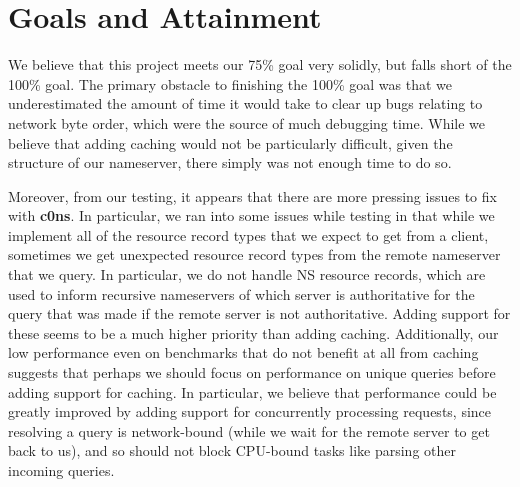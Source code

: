 \documentclass{article}
\newcommand\Kwd[1]{{\sffamily\bfseries{#1}}}
\begin{document}
\section{Goals and Attainment}

We believe that this project meets our 75\% goal very solidly, but falls short of the 100\% goal. The primary obstacle to finishing the 100\% goal was that we underestimated the amount of time it would take to clear up bugs relating to network byte order, which were the source of much debugging time. While we believe that adding caching would not be particularly difficult, given the structure of our nameserver, there simply was not enough time to do so.

Moreover, from our testing, it appears that there are more pressing issues to fix with \Kwd{c0ns}. In particular, we ran into some issues while testing in that while we implement all of the resource record types that we expect to get from a client, sometimes we get unexpected resource record types from the remote nameserver that we query. In particular, we do not handle NS resource records, which are used to inform recursive nameservers of which server is authoritative for the query that was made if the remote server is not authoritative. Adding support for these seems to be a much higher priority than adding caching. Additionally, our low performance even on benchmarks that do not benefit at all from caching suggests that perhaps we should focus on performance on unique queries before adding support for caching. In particular, we believe that performance could be greatly improved by adding support for concurrently processing requests, since resolving a query is network-bound (while we wait for the remote server to get back to us), and so should not block CPU-bound tasks like parsing other incoming queries.



\end{document}
